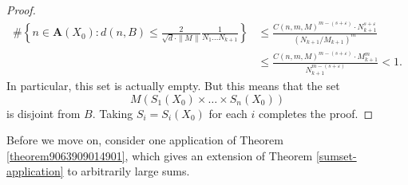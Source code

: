 \begin{proof}
    \begin{align*}
        \# \left\{ n \in \mathbf{A}(X_0) : d(n,B) \leq \frac{2}{\sqrt{d} \cdot \| M \|} \frac{1}{N_1 \dots N_{k+1}} \right\} &\leq \frac{C(n,m,M)^{m - (s + \varepsilon)} \cdot N_{k+1}^{s + \varepsilon}}{(N_{k+1}/M_{k+1})^m}\\
        &\leq \frac{C(n,m,M)^{m - (s + \varepsilon)} \cdot M_{k+1}^m}{N_{k+1}^{m - (s + \varepsilon)}} < 1.
    \end{align*}
    In particular, this set is actually empty. But this means that the set
    \[ M(S_1(X_0) \times \dots \times S_n(X_0)) \]
    is disjoint from $B$. Taking $S_i = S_i(X_0)$ for each $i$ completes the proof.
\end{proof}

Before we move on, consider one application of Theorem \ref{theorem9063909014901}, which gives an extension of Theorem \ref{sumset-application} to arbitrarily large sums.

